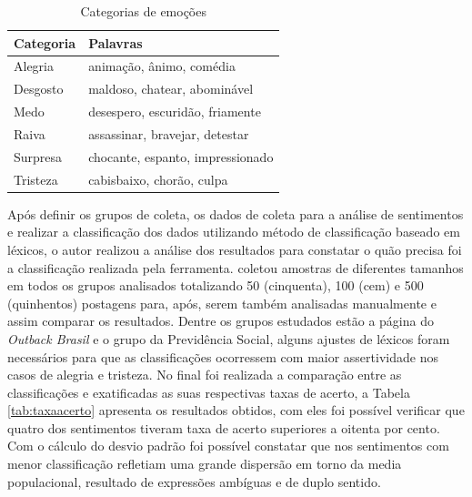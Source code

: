 \begin{table}[h!]
  \begin{center}
    \caption{Categorias de emoções}
    \label{tab:categoriaemo}
    \begin{tabular}{ll} %
      \textbf{Categoria} & \textbf{Palavras}\\
      \hline
      Alegria&animação, ânimo, comédia\\
      Desgosto&maldoso, chatear, abominável\\
      Medo&desespero, escuridão, friamente\\
      Raiva&assassinar, bravejar, detestar\\
      Surpresa&chocante, espanto, impressionado\\
      Tristeza&cabisbaixo, chorão, culpa\\
      \hline
    \end{tabular}
  \end{center}
\end{table}
Após definir os grupos de coleta, os dados de coleta para a análise de sentimentos e realizar a classificação dos dados utilizando método de classificação baseado em léxicos, o autor realizou a análise dos resultados para constatar o quão precisa foi a classificação realizada pela ferramenta.  coletou amostras de diferentes tamanhos em todos os grupos analisados totalizando 50 (cinquenta), 100 (cem) e 500 (quinhentos) postagens para, após, serem também analisadas manualmente e assim comparar os resultados. Dentre os grupos estudados estão a página do \textit{Outback Brasil} e o grupo da Previdência Social, alguns ajustes de léxicos foram necessários para que as classificações ocorressem com maior assertividade nos casos de alegria e tristeza. No final foi realizada a comparação entre as classificações e exatificadas as suas respectivas taxas de acerto, a Tabela \ref{tab:taxaacerto} apresenta os resultados obtidos, com eles foi possível verificar que quatro dos sentimentos tiveram taxa de acerto superiores a oitenta por cento. Com o cálculo do desvio padrão foi possível constatar que nos sentimentos com menor classificação refletiam uma grande dispersão em torno da media populacional, resultado de expressões ambíguas e de duplo sentido.

